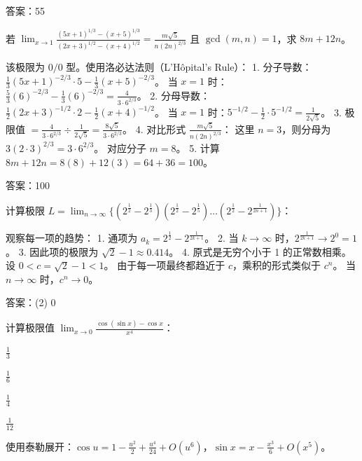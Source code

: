 \begin{questions}
\begin{solution}
答案：55
\end{solution}

\question 
若 $\lim_{x \to 1} \frac{(5x+1)^{1/3} - (x+5)^{1/3}}{(2x+3)^{1/2} - (x+4)^{1/2}} = \frac{m\sqrt{5}}{n(2n)^{2/3}}$ 且 $\gcd(m, n) = 1$，求 $8m + 12n$。

\begin{solution}
该极限为 $0/0$ 型。使用洛必达法则（L'Hôpital's Rule）：
1. 分子导数：$\frac{1}{3}(5x+1)^{-2/3} \cdot 5 - \frac{1}{3}(x+5)^{-2/3}$。
   当 $x=1$ 时：$\frac{5}{3}(6)^{-2/3} - \frac{1}{3}(6)^{-2/3} = \frac{4}{3 \cdot 6^{2/3}}$。
2. 分母导数：$\frac{1}{2}(2x+3)^{-1/2} \cdot 2 - \frac{1}{2}(x+4)^{-1/2}$。
   当 $x=1$ 时：$5^{-1/2} - \frac{1}{2} \cdot 5^{-1/2} = \frac{1}{2\sqrt{5}}$。
3. 极限值 $= \frac{4}{3 \cdot 6^{2/3}} \div \frac{1}{2\sqrt{5}} = \frac{8\sqrt{5}}{3 \cdot 6^{2/3}}$。
4. 对比形式 $\frac{m\sqrt{5}}{n(2n)^{2/3}}$：
   这里 $n=3$，则分母为 $3(2 \cdot 3)^{2/3} = 3 \cdot 6^{2/3}$。
   对应分子 $m=8$。
5. 计算 $8m + 12n = 8(8) + 12(3) = 64 + 36 = 100$。

答案：100
\end{solution}

\question 
计算极限 $L = \lim_{n \to \infty} \{ (2^{\frac{1}{2}} - 2^{\frac{1}{3}})(2^{\frac{1}{2}} - 2^{\frac{1}{5}}) \dots (2^{\frac{1}{2}} - 2^{\frac{1}{2n+1}}) \}$：

\begin{solution}
观察每一项的趋势：
1. 通项为 $a_k = 2^{\frac{1}{2}} - 2^{\frac{1}{2k+1}}$。
2. 当 $k \to \infty$ 时，$2^{\frac{1}{2k+1}} \to 2^0 = 1$。
3. 因此项的极限为 $\sqrt{2} - 1 \approx 0.414$。
4. 原式是无穷个小于 1 的正常数相乘。
   设 $0 < c = \sqrt{2}-1 < 1$。
   由于每一项最终都趋近于 $c$，乘积的形式类似于 $c^n$。
   当 $n \to \infty$ 时，$c^n \to 0$。

答案：(2) 0
\end{solution}

\question 
计算极限值 $\lim_{x \to 0} \frac{\cos(\sin x) - \cos x}{x^4}$：
\begin{choices}
    \item $\frac{1}{3}$
    \item $\frac{1}{6}$
    \item $\frac{1}{4}$
    \item $\frac{1}{12}$
\end{choices}

\begin{solution}
使用泰勒展开：$\cos u = 1 - \frac{u^2}{2} + \frac{u^4}{24} + O(u^6)$，$\sin x = x - \frac{x^3}{6} + O(x^5)$。


\end{solution}
\end{questions}
